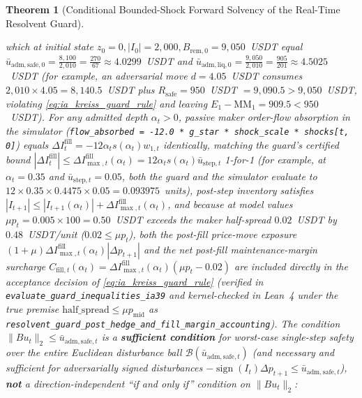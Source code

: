 \documentclass[12pt]{article}
\newtheorem{theorem}{Theorem}[section]
\theoremstyle{definition}
\theoremstyle{remark}
\begin{document}
\begin{theorem}[Conditional Bounded-Shock Forward Solvency of the Real-Time Resolvent Guard]
\begin{enumerate}
which at initial state $z_0 = 0, |I_0| = 2{,}000, B_{\mathrm{rem},0} = 9{,}050$~USDT equal $\bar{u}_{\mathrm{adm,safe},0} = \frac{8{,}100}{2{,}010} = \frac{270}{67} \approx 4.0299$~USDT and $\bar{u}_{\mathrm{adm,liq},0} = \frac{9{,}050}{2{,}010} = \frac{905}{201} \approx 4.5025$~USDT (for example, an adversarial move $d = 4.05$~USDT consumes $2{,}010 \times 4.05 = 8{,}140.5$~USDT plus $R_{\mathrm{safe}} = 950$~USDT $= 9{,}090.5 > 9{,}050$~USDT, violating \eqref{eq:ia_kreiss_guard_rule} and leaving $E_1 - \mathrm{MM}_1 = 909.5 < 950$~USDT). For any admitted depth $\alpha_t > 0$, passive maker order-flow absorption in the simulator (\texttt{flow\_absorbed = -12.0 * g\_star * shock\_scale * shocks[t, 0]}) equals $\Delta I^{\mathrm{fill}}_t = -12\alpha_t s(\alpha_t) w_{1,t}$ identically, matching the guard's certified bound $|\Delta I^{\mathrm{fill}}_t| \le \Delta I_{\max,t}^{\mathrm{fill}}(\alpha_t) = 12\alpha_t s(\alpha_t)\bar{u}_{\mathrm{step},t}$ 1-for-1 (for example, at $\alpha_t = 0.35$ and $\bar{u}_{\mathrm{step},t} = 0.05$, both the guard and the simulator evaluate to $12 \times 0.35 \times 0.4475 \times 0.05 = 0.093975$~units), post-step inventory satisfies $|I_{t+1}| \le |I_{t+1}(\alpha_t)| + \Delta I_{\max,t}^{\mathrm{fill}}(\alpha_t)$, and because at model values $\mu p_t = 0.005 \times 100 = 0.50$~USDT exceeds the maker half-spread $0.02$~USDT by $0.48$~USDT/unit ($0.02 \le \mu p_t$), both the post-fill price-move exposure $(1+\mu)\Delta I_{\max,t}^{\mathrm{fill}}(\alpha_t)|\Delta p_{t+1}|$ and the net post-fill maintenance-margin surcharge $C_{\mathrm{fill},t}(\alpha_t) = \Delta I_{\max,t}^{\mathrm{fill}}(\alpha_t)(\mu p_t - 0.02)$ are included directly in the acceptance decision of \eqref{eq:ia_kreiss_guard_rule} (verified in \nolinkurl{evaluate_guard_inequalities_ia39} and kernel-checked in Lean~4 under the true premise $\text{half\_spread} \le \mu p_{\mathrm{mid}}$ as \nolinkurl{resolvent_guard_post_hedge_and_fill_margin_accounting}). The condition $\|B u_t\|_2 \le \bar{u}_{\mathrm{adm,safe},t}$ is a \textbf{sufficient condition} for worst-case single-step safety over the entire Euclidean disturbance ball $\mathcal{B}(\bar{u}_{\mathrm{adm,safe},t})$ (and necessary and sufficient for \emph{adversarially signed} disturbances $-\operatorname{sign}(I_t)\Delta p_{t+1} \le \bar{u}_{\mathrm{adm,safe},t}$), \textbf{not} a direction-independent ``if and only if'' condition on $\|B u_t\|_2$:
\begin{itemize}

\end{itemize}
\end{enumerate}
\end{theorem}
\end{document}
